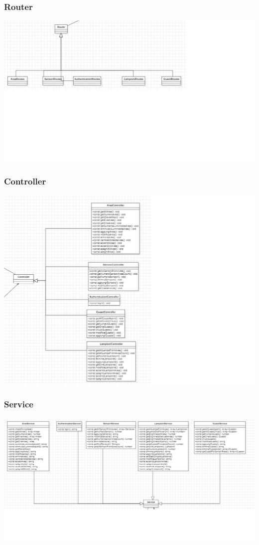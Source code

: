 \documentclass[12pt]{article}
\begin{document}
\subsubsection{Router}
\includegraphics[width=475pt]{Router.png}
\subsubsection{Controller}
\includegraphics[width=475pt]{Controller.png}
\subsubsection{Service}
\includegraphics[width=475pt]{Service.png}
\clearpage
\end{document}
